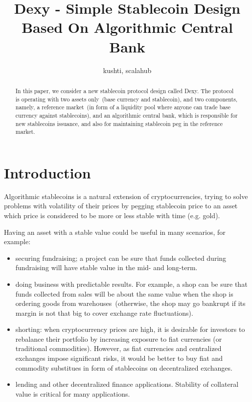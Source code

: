 \documentclass{article}   %
\newcommand{\dx}{Dexy}
\begin{document}
\title{Dexy - Simple Stablecoin Design Based On Algorithmic Central Bank}
\author{kushti, scalahub}


\maketitle

\begin{abstract}
In this paper, we consider a new stablecoin protocol design called \dx. The protocol is operating with two assets only~(base currency and stablecoin), and two components, namely, a reference market~(in form of a liquidity pool where anyone can
trade base currency against stablecoins), and an algorithmic central bank, which is responsible for new stablecoins issuance, and also for maintaining stablecoin peg in the reference market.
\end{abstract}


\section{Introduction}

Algorithmic stablecoins is a natural extension of cryptocurrencies, trying to 
solve problems with volatility of their prices by pegging stablecoin price to an
asset which price is considered to be more or less stable with time (e.g. gold). 

Having an asset with a stable value could be useful in many scenarios, for example:
\begin{itemize}
\item securing fundraising; a project can be sure that funds collected during fundraising will have stable value in the mid- and long-term.
\item doing business with predictable results. For example, a shop can be sure that funds collected from sales will be about the same value when the shop is ordering goods from warehouses~(otherwise, the shop may go bankrupt if its margin is not that big to cover exchange rate fluctuations). 
\item shorting: when cryptocurrency prices are high, it is desirable for investors to rebalance their portfolio by increasing exposure to fiat currencies (or traditional
 commodities). However, as fiat currencies and centralized exchanges impose significant risks, it would be better to buy fiat and commodity substitues in form of stablecoins on decentralized exchanges.
\item lending and other decentralized finance applications. Stability of collateral value is critical for many applications.
\end{itemize}
\end{document}
